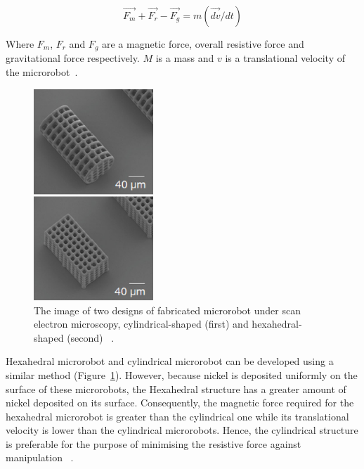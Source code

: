 \documentclass[a4paper,11pt]{article}
\begin{document}
\begin{sloppypar}
\begin{equation}
  \overrightarrow{F_m }+ \overrightarrow{F_r} - \overrightarrow{F_g} = m(\overrightarrow{dv}/dt)
\label{eq:4}
\end{equation}

Where $F_m$, $F_r$ and $F_g$ are a magnetic force, overall resistive force and gravitational force respectively. 
$M$ is a mass and $v$ is a translational velocity of the microrobot~\citep{kim2013fabrication}.  


\begin{figure}
  \begin{center}
  \centering
    \includegraphics[width=0.4\textwidth]{4}
  \caption{The image of two designs of fabricated microrobot under scan electron microscopy, cylindrical-shaped (first)
and hexahedral-shaped (second) ~\citep{kim2013fabrication}.}
  \label{ref4}
\end{center}
\end{figure}

Hexahedral microrobot and cylindrical microrobot can be developed using a similar method (Figure~\ref{ref4}).
 However, because nickel is deposited uniformly on the surface of these microrobots, the 
Hexahedral structure has a greater amount of nickel deposited on its surface. Consequently, the 
magnetic force required for the hexahedral microrobot is greater than the cylindrical one while its 
translational velocity is lower than the cylindrical microrobots. Hence, the cylindrical structure is preferable
 for the purpose of minimising the resistive force against manipulation ~\citep{kim2013fabrication}. 


\end{sloppypar}
\end{document}
